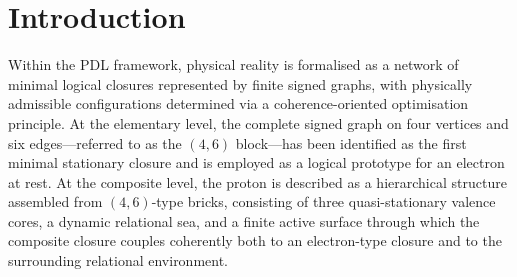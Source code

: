 \documentclass[11pt,a4paper]{article}
\theoremstyle{definition}
\begin{document}
\begin{abstract}
We demonstrate that the PDL proton quintuple $(24,28,930,10087,11017)$, together with its associated hierarchical organisation, satisfies all admissibility criteria and achieves a high value of the selection functional within a bounded region of the integer-parameter space.\cite{Combinatorial_Proton_v2_2026,Alpha_PDL_v2_2026} We further articulate an explicit programme for a local combinatorial uniqueness conjecture, asserting that, in a suitable neighbourhood of the PDL proton in parameter space, no other admissible configuration realises a comparable value of $S$.\cite{Combinatorial_Proton_v2_2026,PDL_Global_Mapping_2026} While a full proof of uniqueness is not claimed, the paper identifies a precise mathematical target and a concrete search strategy, thereby strengthening the interpretation of the PDL proton architecture as a structurally selected, rather than freely adjustable, element of the framework.
\end{abstract}

\section{Introduction}

Within the PDL framework, physical reality is formalised as a network of minimal logical closures represented by finite signed graphs, with physically admissible configurations determined via a coherence-oriented optimisation principle.\cite{PDL_Intro_2026,PDL_Main_2026,PDL_French_2026,PDL_Global_Mapping_2026} At the elementary level, the complete signed graph on four vertices and six edges—referred to as the $(4,6)$ block—has been identified as the first minimal stationary closure and is employed as a logical prototype for an electron at rest.\cite{PDL_Main_2026} At the composite level, the proton is described as a hierarchical structure assembled from $(4,6)$-type bricks, consisting of three quasi-stationary valence cores, a dynamic relational sea, and a finite active surface through which the composite closure couples coherently both to an electron-type closure and to the surrounding relational environment.\cite{PDL_Main_2026,Combinatorial_Proton_v2_2026}
\end{document}
